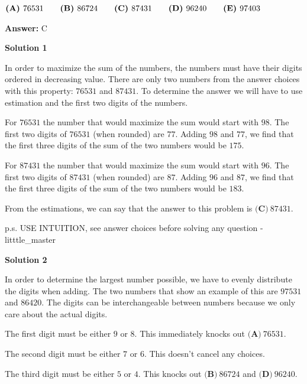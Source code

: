 \begin{enumerate}
 $\textbf{(A)}\hspace{.05in}76531\qquad\textbf{(B)}\hspace{.05in}86724\qquad\textbf{(C)}\hspace{.05in}87431\qquad\textbf{(D)}\hspace{.05in}96240\qquad\textbf{(E)}\hspace{.05in}97403$

 \textbf{Answer: }C



\textbf{Solution 1}

In order to maximize the sum of the numbers, the numbers must have their digits ordered in decreasing value. There are only two numbers from the answer choices with this property: $76531$ and $87431$. To determine the answer we will have to use estimation and the first two digits of the numbers.

 For $76531$ the number that would maximize the sum would start with $98$. The first two digits of $76531$ (when rounded) are  $77$. Adding $98$ and $77$, we find that the first three digits of the sum of the two numbers would be $175$.

 For $87431$ the number that would maximize the sum would start with $96$. The first two digits of $87431$ (when rounded) are $87$. Adding $96$ and $87$, we find that the first three digits of the sum of the two numbers would be $183$.

 From the estimations, we can say that the answer to this problem is $\boxed{\textbf{(C)}\ 87431}$.

 p.s. USE INTUITION, see answer choices before solving any question -litttle\_master

 



\textbf{Solution 2}

In order to determine the largest number possible, we have to evenly distribute the digits when adding. The two numbers that show an example of this are $97531$ and $86420$. The digits can be interchangeable between numbers because we only care about the actual digits. 

 The first digit must be either $9$ or $8$. This immediately knocks out $\textbf{(A)}\ 76531$. 

 The second digit must be either $7$ or $6$. This doesn't cancel any choices.

 The third digit must be either $5$ or $4$. This knocks out $\textbf{(B)}\ 86724$ and $\textbf{(D)}\ 96240$. 


\end{enumerate}

